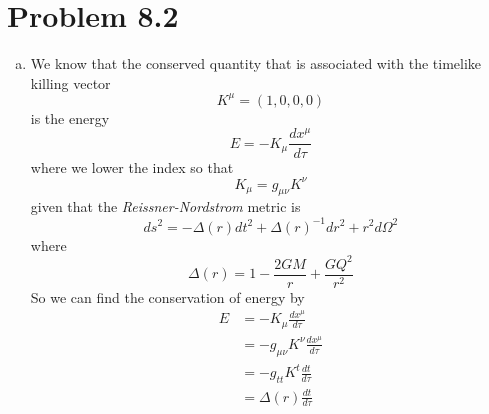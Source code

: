\documentclass[11pt]{article}
\numberwithin{equation}{section}
\newcommand{\HWnum}{8}
\begin{document}
\section{Problem \HWnum.2}
\begin{enumerate}[(a)]
\item
We know that the conserved quantity that is associated with the timelike killing vector 
$$K^{\mu} = (1,0,0,0)$$
is the energy 
$$E = -K_{\mu}\frac{dx^{\mu}}{d\tau}$$
where we lower the index so that
$$K_{\mu} = g_{\mu\nu}K^{\nu}$$
given that the \emph{Reissner-Nordstrom} metric is
$$ds^2 = -\Delta(r)dt^2 + \Delta(r)^{-1}dr^2+r^2d\Omega^2$$
where
$$\Delta(r) = 1 - \frac{2GM}{r} + \frac{GQ^2}{r^2}$$
So we can find the conservation of energy by
\begin{align*}
E &= -K_{\mu}\frac{dx^{\mu}}{d\tau}\\
&= -g_{\mu\nu}K^{\nu}\frac{dx^{\mu}}{d\tau}\\
&= -g_{tt}K^{t}\frac{dt}{d\tau}\\
&= \Delta(r)\frac{dt}{d\tau}
\end{align*}


\end{enumerate}
\end{document}
